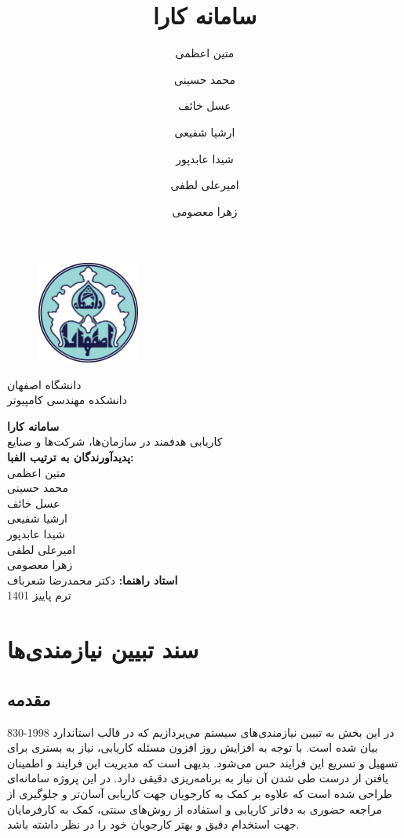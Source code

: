 \documentclass[12pt]{article}
\author{متین اعظمی}
\author{محمد حسینی}
\author{عسل خائف}
\author{ارشیا شفیعی}
\author{شیدا عابدپور}
\author{امیرعلی لطفی}
\author{زهرا معصومی}
\title{سامانه کارا}
\begin{document}
	\begin{figure}
		\centering
		\includegraphics[width=0.3\textwidth]{files/logo}
	\end{figure}
	\begin{center}
		دانشگاه اصفهان\\
		دانشکده مهندسی کامپیوتر
		\vspace{2\baselineskip}

		{\Huge \textbf{سامانه کارا}}\\

		\vspace{1\baselineskip}
		کاریابی هدفمند در سازمان‌ها، شرکت‌ها و صنایع\\
		\vspace{2\baselineskip}
		\textbf{پدیدآورندگان به ترتیب الفبا:}\\
		متین اعظمی\\
		محمد حسینی\\
		عسل خائف\\
		ارشیا شفیعی\\
		شیدا عابدپور\\
		امیرعلی لطفی\\
		زهرا معصومی\\

		\vspace{1\baselineskip}
		{\textbf{استاد راهنما:}}
		 دکتر محمدرضا شعرباف\\
		\vspace{2\baselineskip}
		ترم پاییز 1401

	\end{center}
	\newpage
	\tableofcontents
	\newpage

	\section{سند تبیین نیازمندی‌ها}

	\subsection{مقدمه}
	در این بخش به تبیین نیازمندی‌های سیستم می‌پردازیم که در قالب استاندارد 1998-830
	\textbf{}
	 بیان شده است.
	با توجه به افزایش روز افزون مسئله کاریابی، نیاز به بستری برای تسهیل و تسریع این فرایند حس می‌شود. بدیهی است که مدیریت این فرایند و اطمینان یافتن از درست طی شدن آن نیاز به برنامه‌ریزی دقیقی دارد.
	در این پروژه سامانه‌ای طراحی شده است که علاوه بر کمک به کارجویان جهت کاریابی آسان‌تر و جلوگیری از مراجعه حضوری به دفاتر کاریابی و استفاده از روش‌های سنتی، کمک به کارفرمایان جهت استخدام دقیق و بهتر کارجویان خود را در نظر داشته باشد.
\end{document}
